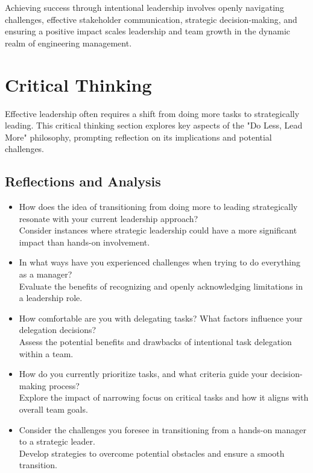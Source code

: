 \documentclass[10pt]{article}
\begin{document}
Achieving success through intentional leadership involves openly navigating challenges, effective stakeholder communication, strategic decision-making, and ensuring a positive impact scales leadership and team growth in the dynamic realm of engineering management.


\section{Critical Thinking}
Effective leadership often requires a shift from doing more tasks to strategically leading. This critical thinking section explores key aspects of the "Do Less, Lead More" philosophy, prompting reflection on its implications and potential challenges.

\subsection{Reflections and Analysis}
\begin{itemize}
    \item How does the idea of transitioning from doing more to leading strategically resonate with your current leadership approach? \\
    Consider instances where strategic leadership could have a more significant impact than hands-on involvement.

    \item In what ways have you experienced challenges when trying to do everything as a manager? \\
    Evaluate the benefits of recognizing and openly acknowledging limitations in a leadership role.
    
    \item How comfortable are you with delegating tasks? What factors influence your delegation decisions? \\
    Assess the potential benefits and drawbacks of intentional task delegation within a team.
    
    \item How do you currently prioritize tasks, and what criteria guide your decision-making process? \\
    Explore the impact of narrowing focus on critical tasks and how it aligns with overall team goals.

    
    \item Consider the challenges you foresee in transitioning from a hands-on manager to a strategic leader.\\
    Develop strategies to overcome potential obstacles and ensure a smooth transition.
    
\end{itemize}
\end{document}
